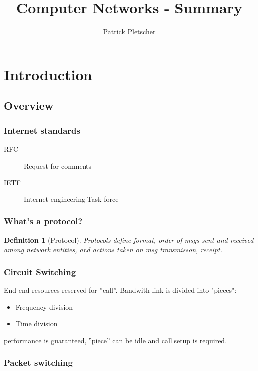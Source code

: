 \documentclass[10pt, a4paper, twocolumn]{scrartcl}
\title{Computer Networks - Summary}
\author{Patrick Pletscher}
\newtheorem{definition}{Definition}
\begin{document}
\maketitle

\section{Introduction}

\subsection{Overview}

\subsubsection{Internet standards}
\begin{description}
	\item[RFC] Request for comments
	\item[IETF] Internet engineering Task force
\end{description}

\subsubsection{What's a protocol?}
\begin{definition}[Protocol]
	Protocols define format, order of msgs sent and received among network entities, and actions taken on msg transmisson, receipt.
\end{definition}

\subsubsection{Circuit Switching}

End-end resources reserved for ''call''. Bandwith link is divided into "pieces":
\begin{itemize}
	\item Frequency  division
	\item Time division
\end{itemize}

performance is guaranteed, ''piece'' can be idle and call setup is required.

\subsubsection{Packet switching}
\end{document}
